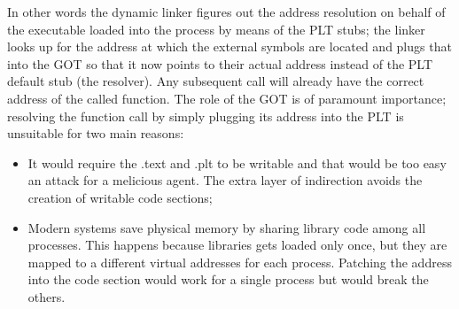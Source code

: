 In other words the dynamic linker figures out the address resolution on behalf of the executable loaded into the process
by means of the PLT stubs; the linker looks up for the address at which the external symbols are located and plugs that
into the GOT so that it now points to their actual address instead of the PLT default stub (the resolver). Any
subsequent call will already have the correct address of the called function.
The role of the GOT is of paramount importance; resolving the function call by simply plugging its address into the PLT
is unsuitable for two main reasons:
\begin{itemize}
    \item It would require the {\ttfamily .text} and {\ttfamily .plt} to be writable and that would be too easy an
        attack for a melicious agent. The extra layer of indirection avoids the creation of writable code sections;
    \item Modern systems save physical memory by sharing library code among all processes. This happens because
        libraries gets loaded only once, but they are mapped to a different virtual addresses for each process. Patching
        the address into the code section would work for a single process but would break the others.
\end{itemize}

